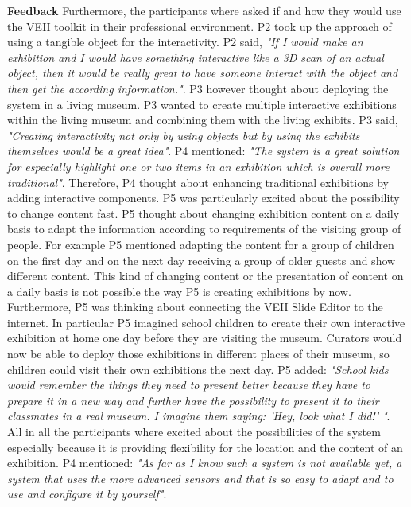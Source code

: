 \textbf{Feedback}
\newline
Furthermore, the participants where asked if and how they would use the VEII toolkit in their professional environment. P2 took up the approach of using a tangible object for the interactivity. P2 said, \textit{"If I would make an exhibition and I would have something interactive like a 3D scan of an actual object, then it would be really great to have someone interact with the object and then get the according information."}. P3 however thought about deploying the system in a living museum. P3 wanted to create multiple interactive exhibitions within the living museum and combining them with the living exhibits. P3 said, \textit{"Creating interactivity not only by using objects but by using the exhibits themselves would be a great idea"}. P4 mentioned: \textit{"The system is a great solution for especially highlight one or two items in an exhibition which is overall more traditional"}. Therefore, P4 thought about enhancing traditional exhibitions by adding interactive components. P5 was particularly excited about the possibility to change content fast. P5 thought about changing exhibition content on a daily basis to adapt the information according to requirements of the visiting group of people. For example P5 mentioned adapting the content for a group of children on the first day and on the next day receiving a group of older guests and show different content. This kind of changing content or the presentation of content on a daily basis is not possible the way P5 is creating exhibitions by now. Furthermore, P5 was thinking about connecting the VEII Slide Editor to the internet. In particular P5 imagined school children to create their own interactive exhibition at home one day before they are visiting the museum. Curators would now be able to deploy those exhibitions in different places of their museum, so children could visit their own exhibitions the next day. P5 added: \textit{"School kids would remember the things they need to present better because they have to prepare it in a new way and further have the possibility to present it to their classmates in a real museum. I imagine them saying: 'Hey, look what I did!' "}. All in all the participants where excited about the possibilities of the system especially because it is providing flexibility for the location and the content of an exhibition. P4 mentioned: \textit{"As far as I know such a system is not available yet, a system that uses the more advanced sensors and that is so easy to adapt and to use and configure it by yourself"}.

